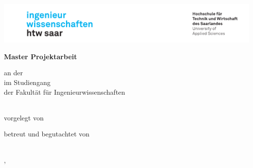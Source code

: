 \begin{titlepage}\linespread{1.5}\selectfont
\includegraphics[width=\linewidth]{Graphics/htwsaar_Logo_inwi_head_VF_4C_crop}
  \begin{center}
    \large
    \hfill
    \vfill
    \begingroup
      \Large\bfseries Master Projektarbeit
    \endgroup

    \bigskip

    an der \myUni \\
    im Studiengang \myDegreeCourse \\
    der Fakultät für Ingenieurwissenschaften \\ 

  \vfill

  \begingroup
    \Large\bfseries\myTitle
  \endgroup

  \bigskip

  vorgelegt von \\
  \myName

  \vfill

  betreut und begutachtet von \\
  \myFirstProf \\

  \vfill

  \myLocation, \myTime

    \end{center}
\end{titlepage}

